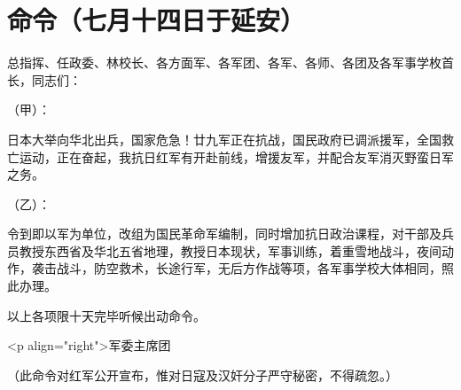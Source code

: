 \section[命令（七月十四日于延安）]{命令（七月十四日于延安）}


总指挥、任政委、林校长、各方面军、各军团、各军、各师、各团及各军事学枚首长，同志们：

（甲）：

日本大举向华北出兵，国家危急！廿九军正在抗战，国民政府已调派援军，全国救亡运动，正在奋起，我抗日红军有开赴前线，增援友军，并配合友军消灭野蛮日军之务。

（乙）：

令到即以军为单位，改组为国民革命军编制，同时增加抗日政治课程，对干部及兵员教授东西省及华北五省地理，教授日本现状，军事训练，着重雪地战斗，夜间动作，袭击战斗，防空救术，长途行军，无后方作战等项，各军事学校大体相同，照此办理。

以上各项限十天完毕听候出动命令。

<p align="right">军委主席团

（此命令对红军公开宣布，惟对日寇及汉奸分子严守秘密，不得疏忽。）


